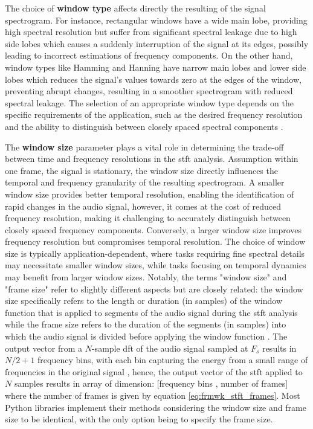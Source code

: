 The choice of \textbf{window type} affects directly the resulting of the signal spectrogram. For instance, rectangular windows have a wide main lobe, providing high spectral resolution but suffer from significant spectral leakage due to high side lobes which causes a suddenly interruption of the signal at its edges, possibly leading to incorrect estimations of frequency components. On the other hand, window types like Hamming and Hanning have narrow main lobes and lower side lobes which reduces the signal's values towards zero at the edges of the window, preventing abrupt changes, resulting in a smoother spectrogram with reduced spectral leakage. The selection of an appropriate window type depends on the specific requirements of the application, such as the desired frequency resolution and the ability to distinguish between closely spaced spectral components \cite{Zoelzer2008}.

The \textbf{window size} parameter plays a vital role in determining the trade-off between time and frequency resolutions in the \gls{stft} analysis. Assumption within one frame, the signal is stationary, the window size directly influences the temporal and frequency granularity of the resulting spectrogram. A smaller window size provides better temporal resolution, enabling the identification of rapid changes in the audio signal, however, it comes at the cost of reduced frequency resolution, making it challenging to accurately distinguish between closely spaced frequency components. Conversely, a larger window size improves frequency resolution but compromises temporal resolution. The choice of window size is typically application-dependent, where tasks requiring fine spectral details may necessitate smaller window sizes, while tasks focusing on temporal dynamics may benefit from larger window sizes. Notably, the terms "window size" and "frame size" refer to slightly different aspects but are closely related: the window size specifically refers to the length or duration (in samples) of the window function that is applied to segments of the audio signal during the \gls{stft} analysis while the frame size refers to the duration of the segments (in samples) into which the audio signal is divided before applying the window function \cite{Smith2013}. The output vector from a $N$-sample \gls{dft} of the audio signal sampled at $F_s$ results in $N/2 +1$ frequency bins, with each bin capturing the energy from a small range of frequencies in the original signal \cite{Abreha2014}, hence, the output vector of the \gls{stft} applied to $N$ samples results in array of dimension: [frequency bins , number of frames] where the number of frames is given by equation \ref{eq:frmwk_stft_frames}. Most Python libraries implement their methods considering the window size and frame size to be identical, with the only option being to specify the frame size.

